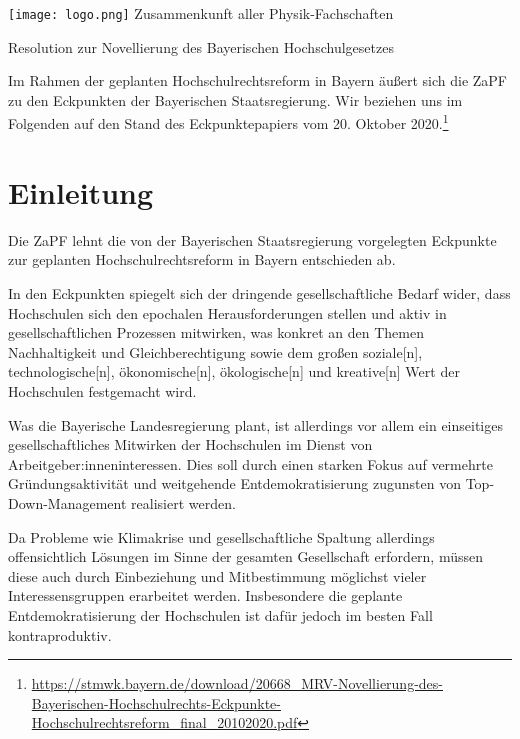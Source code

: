 \documentclass[a4paper]{scrartcl}
\begin{document}
    \hspace{0.87\textwidth}
    \begin{minipage}{120pt}
        \vspace{-1.8cm}
        \texttt{[image: logo.png]}
        \centering
        \small Zusammenkunft aller Physik-Fachschaften
    \end{minipage}
    \begin{center}
        \huge{Resolution zur Novellierung des Bayerischen Hochschulgesetzes}\vspace{.25\baselineskip}\\
        \normalsize
    \end{center}
    \vspace{1cm}

Im Rahmen der geplanten Hochschulrechtsreform in Bayern äußert sich die ZaPF zu den Eckpunkten der Bayerischen Staatsregierung. Wir beziehen uns im Folgenden auf den Stand des Eckpunktepapiers vom 20. Oktober 2020.\footnote{\url{https://stmwk.bayern.de/download/20668_MRV-Novellierung-des-Bayerischen-Hochschulrechts-Eckpunkte-Hochschulrechtsreform_final_20102020.pdf}}

\section{Einleitung}

Die ZaPF lehnt die von der Bayerischen Staatsregierung vorgelegten Eckpunkte zur geplanten Hochschulrechtsreform in Bayern entschieden ab.

In den Eckpunkten spiegelt sich der dringende gesellschaftliche Bedarf wider, dass Hochschulen sich den epochalen Herausforderungen stellen und aktiv in gesellschaftlichen Prozessen mitwirken, was konkret an den Themen \glqq Nachhaltigkeit\grqq{} und \glqq Gleichberechtigung\grqq{} sowie dem großen \glqq soziale[n], technologische[n], ökonomische[n], ökologische[n] und kreative[n]\grqq{} Wert der Hochschulen festgemacht wird.

Was die Bayerische Landesregierung plant, ist allerdings vor allem ein einseitiges gesellschaftliches Mitwirken der Hochschulen im Dienst von Arbeitgeber:inneninteressen. Dies soll durch einen starken Fokus auf vermehrte Gründungsaktivität und weitgehende Entdemokratisierung zugunsten von Top-Down-Management realisiert werden.

Da Probleme wie Klimakrise und gesellschaftliche Spaltung allerdings offensichtlich Lösungen im Sinne der gesamten Gesellschaft erfordern, müssen diese auch durch Einbeziehung und Mitbestimmung möglichst vieler Interessensgruppen erarbeitet werden. Insbesondere die geplante Entdemokratisierung der Hochschulen ist dafür jedoch im besten Fall kontraproduktiv.
\end{document}

